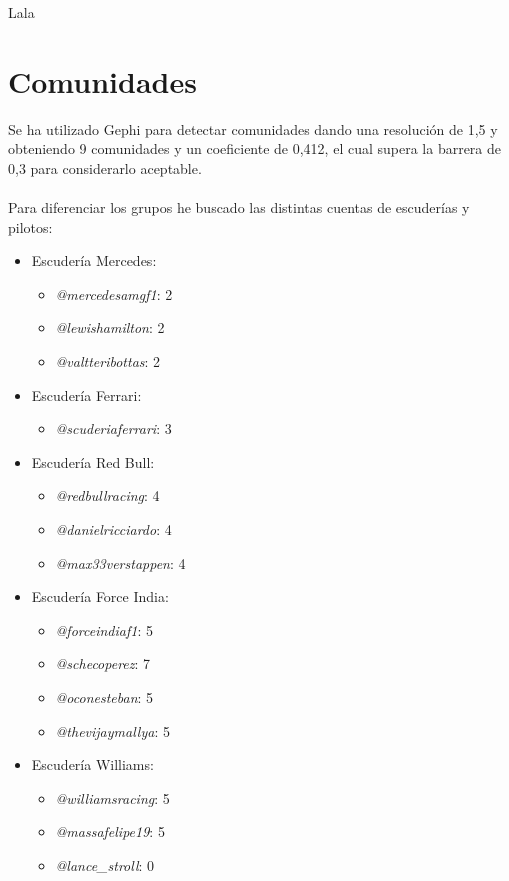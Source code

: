 Lala

\section{Comunidades}

Se ha utilizado Gephi para detectar comunidades dando una resolución de 1,5 y obteniendo 9 comunidades y un coeficiente de 0,412, el cual supera la barrera de 0,3 para considerarlo aceptable.
\\ \\
Para diferenciar los grupos he buscado las distintas cuentas de escuderías y pilotos:

\begin{itemize}
	\item Escudería Mercedes:
	\begin{itemize}
		\item \textit{@mercedesamgf1}: 2
		\item \textit{@lewishamilton}: 2
		\item \textit{@valtteribottas}: 2
	\end{itemize}

	\item Escudería Ferrari:
	\begin{itemize}
		\item \textit{@scuderiaferrari}: 3
	\end{itemize}

	\item Escudería Red Bull:
	\begin{itemize}
		\item \textit{@redbullracing}: 4
		\item \textit{@danielricciardo}: 4
		\item \textit{@max33verstappen}: 4
	\end{itemize}
	
	\item Escudería Force India:
	\begin{itemize}
		\item \textit{@forceindiaf1}: 5
		\item \textit{@schecoperez}: 7
		\item \textit{@oconesteban}: 5
		\item \textit{@thevijaymallya}: 5
	\end{itemize}

	\item Escudería Williams:
	\begin{itemize}
		\item \textit{@williamsracing}: 5
		\item \textit{@massafelipe19}: 5
		\item \textit{@lance\_stroll}: 0
	\end{itemize}


\end{itemize}
